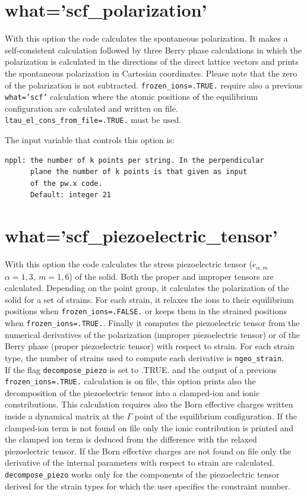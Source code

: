 \documentclass[12pt,a4paper,twoside]{report}
\begin{document}
\newpage
{\color{coral}\section{what='scf\_polarization'}}
\color{black}
With this option the code calculates the spontaneous polarization.
It makes a self-consistent calculation followed by three Berry
phase calculations in which the polarization is calculated in the
directions of the direct lattice vectors and prints the spontaneous 
polarization in Cartesian coordinates. Please note that the zero of 
the polarization is not subtracted.
\texttt{frozen\_ions=.TRUE.} require also a previous \texttt{what='scf'}
calculation where the atomic positions of the equilibrium configuration
are calculated and written on file. \texttt{ltau\_el\_cons\_from\_file=.TRUE.}
must be used.

The input variable that controls this option is:
\begin{verbatim}
nppl: the number of k points per string. In the perpendicular 
      plane the number of k points is that given as input 
      of the pw.x code.
      Default: integer 21
\end{verbatim}

\newpage
{\color{coral}\section{what='scf\_piezoelectric\_tensor'}}
\color{black}
With this option the code calculates the stress piezoelectric tensor 
($e_{\alpha,m}$ $\alpha=1,3,\ m=1,6$) of the solid. Both the proper
and improper tensors are calculated.
Depending on the point group, it calculates the polarization of the
solid for a set of strains. For each strain, it relaxes 
the ions to their equilibrium positions when \texttt{frozen\_ions=.FALSE.} 
or keeps them in the strained positions when \texttt{frozen\_ions=.TRUE.}. 
Finally it computes the piezoelectric tensor from the numerical derivatives 
of the polarization (improper piezoelectric tensor) or of the Berry phase
(proper piezoelectric tensor) with respect to strain.
For each strain type, the number of strains used to compute each derivative 
is \texttt{ngeo\_strain}.\\
If the flag \texttt{decompose\_piezo} is set to .TRUE. and the output
of a previous \texttt{frozen\_ions=.TRUE.} calculation is on file, this
option prints also the decomposition of the piezoelectric tensor into a
clamped-ion and ionic constributions. This calculation requires also
the Born effective charges written inside a dynamical matrix at the
$\Gamma$ point of the equilibrium configuration.
If the clamped-ion term is not found on file only the ionic contribution
is printed and the clamped ion term is deduced from the difference with
the relaxed piezoelectric tensor. If the Born effective charges are
not found on file only the derivative of the internal parameters with
respect to strain are calculated. \texttt{decompose\_piezo} works
only for the components of the piezoelectric tensor derived for the strain
types for which the user specifies the constraint number.
\end{document}
